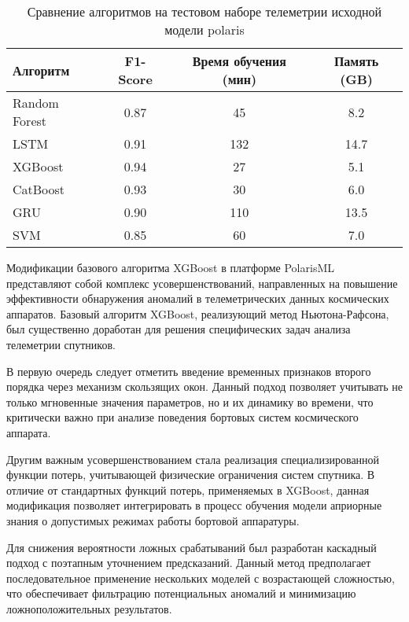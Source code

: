 \begin{table}[H]
	\centering
	\begin{tabular}{|l|c|c|c|}
		\hline
		\textbf{Алгоритм} & \textbf{F1-Score} & \textbf{Время обучения (мин)} & \textbf{Память (GB)} \\
		\hline
		Random Forest     & 0.87              & 45                            & 8.2                  \\
		\hline
		LSTM              & 0.91              & 132                           & 14.7                 \\
		\hline
		XGBoost           & 0.94              & 27                            & 5.1                  \\
		\hline
		CatBoost          & 0.93              & 30                            & 6.0                  \\
		\hline
		GRU               & 0.90              & 110                           & 13.5                 \\
		\hline
		SVM               & 0.85              & 60                            & 7.0                  \\
		\hline
	\end{tabular}
	\caption{Сравнение алгоритмов на тестовом наборе телеметрии исходной модели polaris}\label{tab:ml_comparison}
\end{table}

Модификации базового алгоритма XGBoost в платформе PolarisML представляют собой
комплекс усовершенствований, направленных на повышение эффективности обнаружения
аномалий в телеметрических данных космических аппаратов. Базовый алгоритм
XGBoost, реализующий метод Ньютона-Рафсона, был существенно доработан для
решения специфических задач анализа телеметрии спутников.

В первую очередь следует отметить введение временных признаков второго порядка
через механизм скользящих окон. Данный подход позволяет учитывать не только
мгновенные значения параметров, но и их динамику во времени, что критически
важно при анализе поведения бортовых систем космического аппарата.

Другим важным усовершенствованием стала реализация специализированной функции
потерь, учитывающей физические ограничения систем спутника. В отличие от
стандартных функций потерь, применяемых в XGBoost, данная модификация позволяет
интегрировать в процесс обучения модели априорные знания о допустимых режимах
работы бортовой аппаратуры.

Для снижения вероятности ложных срабатываний был разработан каскадный подход с
поэтапным уточнением предсказаний. Данный метод предполагает последовательное
применение нескольких моделей с возрастающей сложностью, что обеспечивает
фильтрацию потенциальных аномалий и минимизацию ложноположительных результатов.

